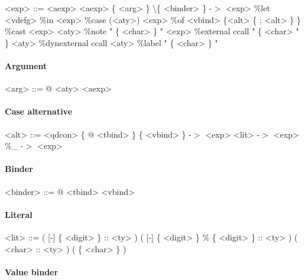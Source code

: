 \begin{grammar}
<exp> ::= <aexp>
     \alt <aexp> \{ <arg> \}
     \alt \textbackslash \{ <binder> \} -$>$ <exp>
     \alt \%let <vdefg> \%in <exp>
     \alt \%case (<aty>) <exp> \%of <vbind> \{<alt> \{ ; <alt> \}  \}
     \alt \%cast <exp> <aty>
     \alt \%note " \{ <char> \} " <exp>
     \alt \%external ccall " \{ <char> " \} <aty>
     \alt \%dynexternal ccall <aty>
     \alt \%label " \{ <char> \} "
\end{grammar}

\paragraph{Argument}

\begin{grammar}
<arg> ::= @ <aty>
     \alt <aexp>
\end{grammar}

\paragraph{Case alternative}

\begin{grammar}
<alt> ::= <qdcon> \{ @ <tbind> \} \{ <vbind> \} -$>$ <exp>
     \alt <lit> -$>$ <exp>
     \alt \%\_ -$>$ <exp>
\end{grammar}

\paragraph{Binder}

\begin{grammar}
<binder> ::= @ <tbind>
        \alt <vbind>
\end{grammar}

\paragraph{Literal}

\begin{grammar}
<lit> ::= ( [-] \{ <digit> \} :: <ty> )
     \alt ( [-] \{ <digit> \} \% \{ <digit> \} :: <ty> )
     \alt ( <char> :: <ty> )
     \alt ( \{ <char> \} )
\end{grammar}

\paragraph{Value binder}

